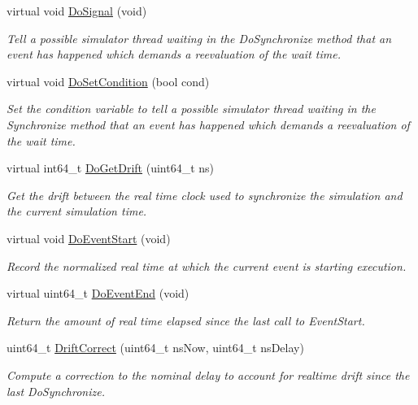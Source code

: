 \begin{DoxyCompactItemize}
virtual void \hyperlink{classns3_1_1WallClockSynchronizer_a8268eaa9a5ad9e633da5cab6e156f05b}{Do\+Signal} (void)
\begin{DoxyCompactList}\small\item\em Tell a possible simulator thread waiting in the Do\+Synchronize method that an event has happened which demands a reevaluation of the wait time. \end{DoxyCompactList}\item 
virtual void \hyperlink{classns3_1_1WallClockSynchronizer_ac909b54b5894485f86d8a972b2dd5dcb}{Do\+Set\+Condition} (bool cond)
\begin{DoxyCompactList}\small\item\em Set the condition variable to tell a possible simulator thread waiting in the Synchronize method that an event has happened which demands a reevaluation of the wait time. \end{DoxyCompactList}\item 
virtual int64\+\_\+t \hyperlink{classns3_1_1WallClockSynchronizer_a8f7eb1d2c3fd95183d566f8aa67a4282}{Do\+Get\+Drift} (uint64\+\_\+t ns)
\begin{DoxyCompactList}\small\item\em Get the drift between the real time clock used to synchronize the simulation and the current simulation time. \end{DoxyCompactList}\item 
virtual void \hyperlink{classns3_1_1WallClockSynchronizer_ac38fdef4f4c95aff0db1a5873415eadf}{Do\+Event\+Start} (void)
\begin{DoxyCompactList}\small\item\em Record the normalized real time at which the current event is starting execution. \end{DoxyCompactList}\item 
virtual uint64\+\_\+t \hyperlink{classns3_1_1WallClockSynchronizer_adcd280b6ae11a7a1e3f9c4ee6a99aff3}{Do\+Event\+End} (void)
\begin{DoxyCompactList}\small\item\em Return the amount of real time elapsed since the last call to Event\+Start. \end{DoxyCompactList}\item 
uint64\+\_\+t \hyperlink{classns3_1_1WallClockSynchronizer_af9eaa5c3014c416b69176fa2234aee90}{Drift\+Correct} (uint64\+\_\+t ns\+Now, uint64\+\_\+t ns\+Delay)
\begin{DoxyCompactList}\small\item\em Compute a correction to the nominal delay to account for realtime drift since the last Do\+Synchronize. \end{DoxyCompactList}\item 

\end{DoxyCompactItemize}
